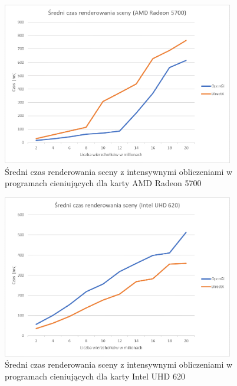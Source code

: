 \documentclass[archive]{mgr}
\begin{document}
\begin{figure}[h!]
  \centering
    \includegraphics[width=0.9\textwidth]{images/shaderon/2.png}
   \caption{Średni czas renderowania sceny z intensywnymi obliczeniami w programach cieniujących dla karty AMD Radeon 5700}
   \label{lab:12}
\end{figure}
\bigbreak
\begin{figure}[h!]
  \centering
    \includegraphics[width=0.9\textwidth]{images/shaderon/3.png}
   \caption{Średni czas renderowania sceny z intensywnymi obliczeniami w programach cieniujących dla karty Intel UHD 620}
   \label{lab:13}
\end{figure}
\newpage
\end{document}
